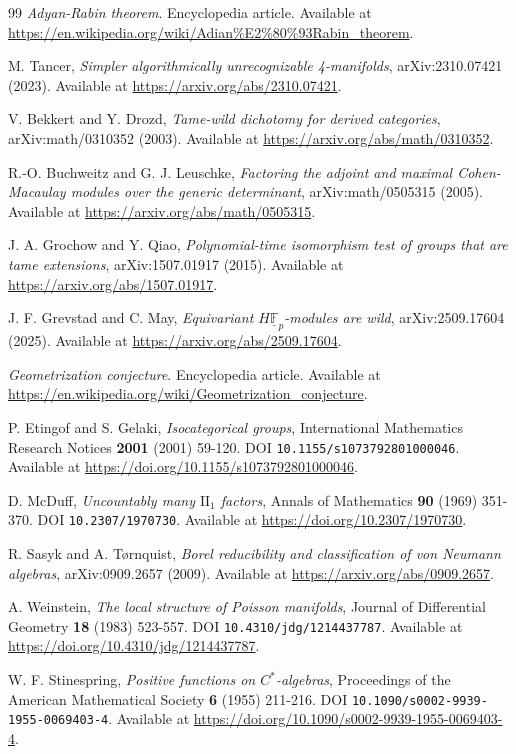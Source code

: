 \documentclass[11pt,letterpaper]{article}
\theoremstyle{definition}
\theoremstyle{remark}
\begin{document}
\begin{thebibliography}{99}
\emph{Adyan-Rabin theorem}. Encyclopedia article. Available at \url{https://en.wikipedia.org/wiki/Adian%E2%80%93Rabin_theorem}.

M. Tancer, \emph{Simpler algorithmically unrecognizable 4-manifolds}, arXiv:2310.07421 (2023). Available at \url{https://arxiv.org/abs/2310.07421}.

V. Bekkert and Y. Drozd, \emph{Tame-wild dichotomy for derived categories}, arXiv:math/0310352 (2003). Available at \url{https://arxiv.org/abs/math/0310352}.

R.-O. Buchweitz and G. J. Leuschke, \emph{Factoring the adjoint and maximal Cohen-Macaulay modules over the generic determinant}, arXiv:math/0505315 (2005). Available at \url{https://arxiv.org/abs/math/0505315}.

J. A. Grochow and Y. Qiao, \emph{Polynomial-time isomorphism test of groups that are tame extensions}, arXiv:1507.01917 (2015). Available at \url{https://arxiv.org/abs/1507.01917}.

J. F. Grevstad and C. May, \emph{Equivariant $H\underline{\mathbb{F}}_p$-modules are wild}, arXiv:2509.17604 (2025). Available at \url{https://arxiv.org/abs/2509.17604}.

\emph{Geometrization conjecture}. Encyclopedia article. Available at \url{https://en.wikipedia.org/wiki/Geometrization_conjecture}.

P. Etingof and S. Gelaki, \emph{Isocategorical groups}, International Mathematics Research Notices \textbf{2001} (2001) 59-120. DOI \texttt{10.1155/s1073792801000046}. Available at \url{https://doi.org/10.1155/s1073792801000046}.

D. McDuff, \emph{Uncountably many $\mathrm{II}_1$ factors}, Annals of Mathematics \textbf{90} (1969) 351-370. DOI \texttt{10.2307/1970730}. Available at \url{https://doi.org/10.2307/1970730}.

R. Sasyk and A. T\o rnquist, \emph{Borel reducibility and classification of von Neumann algebras}, arXiv:0909.2657 (2009). Available at \url{https://arxiv.org/abs/0909.2657}.

A. Weinstein, \emph{The local structure of Poisson manifolds}, Journal of Differential Geometry \textbf{18} (1983) 523-557. DOI \texttt{10.4310/jdg/1214437787}. Available at \url{https://doi.org/10.4310/jdg/1214437787}.

W. F. Stinespring, \emph{Positive functions on $C^*$-algebras}, Proceedings of the American Mathematical Society \textbf{6} (1955) 211-216. DOI \texttt{10.1090/s0002-9939-1955-0069403-4}. Available at \url{https://doi.org/10.1090/s0002-9939-1955-0069403-4}.

\end{thebibliography}
\end{document}
